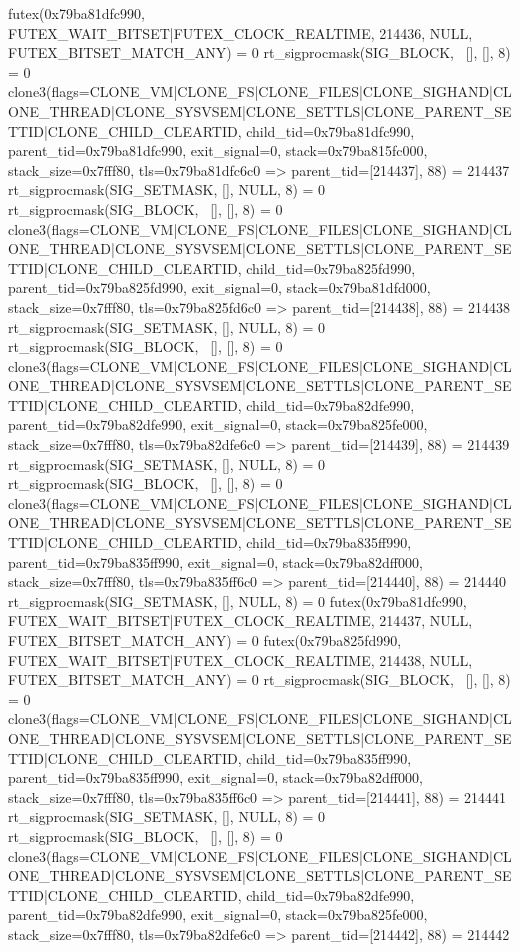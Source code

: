 \begin{breakableverbatim}
futex(0x79ba81dfc990, FUTEX_WAIT_BITSET|FUTEX_CLOCK_REALTIME, 214436, NULL, FUTEX_BITSET_MATCH_ANY) = 0
rt_sigprocmask(SIG_BLOCK, ~[], [], 8)   = 0
clone3({flags=CLONE_VM|CLONE_FS|CLONE_FILES|CLONE_SIGHAND|CLONE_THREAD|CLONE_SYSVSEM|CLONE_SETTLS|CLONE_PARENT_SETTID|CLONE_CHILD_CLEARTID, child_tid=0x79ba81dfc990, parent_tid=0x79ba81dfc990, exit_signal=0, stack=0x79ba815fc000, stack_size=0x7fff80, tls=0x79ba81dfc6c0} => {parent_tid=[214437]}, 88) = 214437
rt_sigprocmask(SIG_SETMASK, [], NULL, 8) = 0
rt_sigprocmask(SIG_BLOCK, ~[], [], 8)   = 0
clone3({flags=CLONE_VM|CLONE_FS|CLONE_FILES|CLONE_SIGHAND|CLONE_THREAD|CLONE_SYSVSEM|CLONE_SETTLS|CLONE_PARENT_SETTID|CLONE_CHILD_CLEARTID, child_tid=0x79ba825fd990, parent_tid=0x79ba825fd990, exit_signal=0, stack=0x79ba81dfd000, stack_size=0x7fff80, tls=0x79ba825fd6c0} => {parent_tid=[214438]}, 88) = 214438
rt_sigprocmask(SIG_SETMASK, [], NULL, 8) = 0
rt_sigprocmask(SIG_BLOCK, ~[], [], 8)   = 0
clone3({flags=CLONE_VM|CLONE_FS|CLONE_FILES|CLONE_SIGHAND|CLONE_THREAD|CLONE_SYSVSEM|CLONE_SETTLS|CLONE_PARENT_SETTID|CLONE_CHILD_CLEARTID, child_tid=0x79ba82dfe990, parent_tid=0x79ba82dfe990, exit_signal=0, stack=0x79ba825fe000, stack_size=0x7fff80, tls=0x79ba82dfe6c0} => {parent_tid=[214439]}, 88) = 214439
rt_sigprocmask(SIG_SETMASK, [], NULL, 8) = 0
rt_sigprocmask(SIG_BLOCK, ~[], [], 8)   = 0
clone3({flags=CLONE_VM|CLONE_FS|CLONE_FILES|CLONE_SIGHAND|CLONE_THREAD|CLONE_SYSVSEM|CLONE_SETTLS|CLONE_PARENT_SETTID|CLONE_CHILD_CLEARTID, child_tid=0x79ba835ff990, parent_tid=0x79ba835ff990, exit_signal=0, stack=0x79ba82dff000, stack_size=0x7fff80, tls=0x79ba835ff6c0} => {parent_tid=[214440]}, 88) = 214440
rt_sigprocmask(SIG_SETMASK, [], NULL, 8) = 0
futex(0x79ba81dfc990, FUTEX_WAIT_BITSET|FUTEX_CLOCK_REALTIME, 214437, NULL, FUTEX_BITSET_MATCH_ANY) = 0
futex(0x79ba825fd990, FUTEX_WAIT_BITSET|FUTEX_CLOCK_REALTIME, 214438, NULL, FUTEX_BITSET_MATCH_ANY) = 0
rt_sigprocmask(SIG_BLOCK, ~[], [], 8)   = 0
clone3({flags=CLONE_VM|CLONE_FS|CLONE_FILES|CLONE_SIGHAND|CLONE_THREAD|CLONE_SYSVSEM|CLONE_SETTLS|CLONE_PARENT_SETTID|CLONE_CHILD_CLEARTID, child_tid=0x79ba835ff990, parent_tid=0x79ba835ff990, exit_signal=0, stack=0x79ba82dff000, stack_size=0x7fff80, tls=0x79ba835ff6c0} => {parent_tid=[214441]}, 88) = 214441
rt_sigprocmask(SIG_SETMASK, [], NULL, 8) = 0
rt_sigprocmask(SIG_BLOCK, ~[], [], 8)   = 0
clone3({flags=CLONE_VM|CLONE_FS|CLONE_FILES|CLONE_SIGHAND|CLONE_THREAD|CLONE_SYSVSEM|CLONE_SETTLS|CLONE_PARENT_SETTID|CLONE_CHILD_CLEARTID, child_tid=0x79ba82dfe990, parent_tid=0x79ba82dfe990, exit_signal=0, stack=0x79ba825fe000, stack_size=0x7fff80, tls=0x79ba82dfe6c0} => {parent_tid=[214442]}, 88) = 214442

\end{breakableverbatim}

